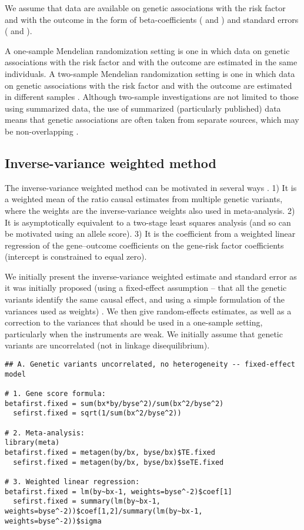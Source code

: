 \documentclass[a4paper,12pt]{article} %
\begin{document}
We assume that data are available on genetic associations with the risk factor and with the outcome in the form of beta-coefficients ( and ) and standard errors ( and ).

A one-sample Mendelian randomization setting is one in which data on genetic associations with the risk factor and with the outcome are estimated in the same individuals. A two-sample Mendelian randomization setting is one in which data on genetic associations with the risk factor and with the outcome are estimated in different samples \citep{pierce2013}. Although two-sample investigations are not limited to those using summarized data, the use of summarized (particularly published) data means that genetic associations are often taken from separate sources, which may be non-overlapping \citep{burgess2014twosample}.

\clearpage

\subsection{Inverse-variance weighted method}
The inverse-variance weighted method can be motivated in several ways \citep{burgess2013genepi}. 1) It is a weighted mean of the ratio causal estimates from multiple genetic variants, where the weights are the inverse-variance weights also used in meta-analysis. 2) It is asymptotically equivalent to a two-stage least squares analysis (and so can be motivated using an allele score). 3) It is the coefficient from a weighted linear regression of the gene--outcome coefficients on the gene-risk factor coefficients (intercept is constrained to equal zero).

We initially present the inverse-variance weighted estimate and standard error as it was initially proposed (using a fixed-effect assumption -- that all the genetic variants identify the same causal effect, and using a simple formulation of the variances used as weights) . We then give random-effects estimates, as well as a correction to the variances that should be used in a one-sample setting, particularly when the instruments are weak. We initially assume that genetic variants are uncorrelated (not in linkage disequilibrium).

\begin{lstlisting}
## A. Genetic variants uncorrelated, no heterogeneity -- fixed-effect model

# 1. Gene score formula:
betafirst.fixed = sum(bx*by/byse^2)/sum(bx^2/byse^2)
  sefirst.fixed = sqrt(1/sum(bx^2/byse^2))

# 2. Meta-analysis:
library(meta)
betafirst.fixed = metagen(by/bx, byse/bx)$TE.fixed
  sefirst.fixed = metagen(by/bx, byse/bx)$seTE.fixed

# 3. Weighted linear regression:
betafirst.fixed = lm(by~bx-1, weights=byse^-2)$coef[1]
  sefirst.fixed = summary(lm(by~bx-1, weights=byse^-2))$coef[1,2]/summary(lm(by~bx-1, weights=byse^-2))$sigma
\end{lstlisting}
\end{document}
